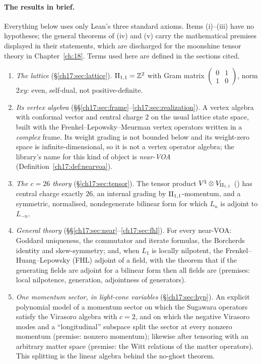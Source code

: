 \paragraph{The results in brief.}  Everything below uses only Lean's three standard axioms.  Items
(i)--(iii) have no hypotheses; the general theorems of (iv) and (v) carry the mathematical premises displayed in
their statements, which are discharged for the moonshine tensor theory in Chapter~\ref{ch:18}.  Terms used here
are defined in the sections cited.
\begin{enumerate}[label=(\roman*)]
\item \emph{The lattice} (\S\ref{ch17:sec:lattice}).  ${\mathrm{II}_{1,1}}={\mathbb{Z}}^2$ with Gram matrix
  $\left(\begin{smallmatrix}0&1\\1&0\end{smallmatrix}\right)$, norm $2xy$: even, self-dual, not positive-definite.
\item \emph{Its vertex algebra} (\S\S\ref{ch17:sec:frame}--\ref{ch17:sec:realization}).  A vertex algebra
   with conformal vector and central charge $2$ on the usual lattice state space, built
  with the Frenkel--Lepowsky--Meurman vertex operators written in a \emph{complex} frame.  Its weight grading is
  not bounded below and its weight-zero space is infinite-dimensional, so it is not a vertex operator algebra; the
  library's name for this kind of object is \emph{near-VOA} (Definition~\ref{ch17:def:nearvoa}).
\item \emph{The $c=26$ theory} (\S\ref{ch17:sec:tensor}).  The tensor product ${V^{\natural}}\otimes{V_{\mathrm{II}_{1,1}}}$
  () has central charge exactly $26$, an internal grading by ${\mathrm{II}_{1,1}}$-momentum,
  and a symmetric, normalised, nondegenerate bilinear form for which $L_n$ is adjoint to $L_{-n}$.
\item \emph{General theory} (\S\S\ref{ch17:sec:near}--\ref{ch17:sec:fhl}).  For every near-VOA: Goddard uniqueness,
  the commutator and iterate formulas, the Borcherds identity and skew-symmetry; and, when $L_1$ is locally
  nilpotent, the Frenkel--Huang--Lepowsky (FHL) adjoint of a field, with the theorem that if the generating fields
  are adjoint for a bilinear form then all fields are (premises: local nilpotence, generation, adjointness of
  generators).
\item \emph{One momentum sector, in light-cone variables} (\S\ref{ch17:sec:hyp}).  An explicit polynomial model of a
  momentum sector on which the Sugawara operators satisfy the Virasoro algebra with $c=2$, and on which the
  negative Virasoro modes and a ``longitudinal'' subspace split the sector at every nonzero momentum (premise:
  nonzero momentum); likewise after tensoring with an arbitrary matter space (premise: the Witt relations of the
  matter operators).  This splitting is the linear algebra behind the no-ghost theorem.
\end{enumerate}


